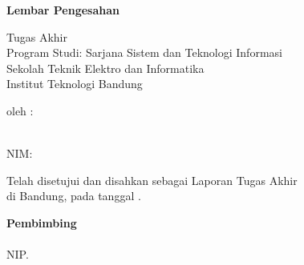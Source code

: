 \clearpage
\pagestyle{empty}

\begin{center}
\smallskip

    {\Large \bfseries Lembar Pengesahan}

    \MakeUppercase{\normalsize \bfseries \thetitle}
    \vfill

    \normalsize Tugas Akhir \\
    Program Studi: Sarjana Sistem dan Teknologi Informasi \\
    Sekolah Teknik Elektro dan Informatika \\
    Institut Teknologi Bandung \\
    \vfill

    \normalsize oleh :

    \normalsize \theauthor \\
    \normalsize NIM: \nim

    \vfill
    \normalsize \normalfont
    Telah disetujui dan disahkan sebagai Laporan Tugas Akhir \\
    di Bandung, pada tanggal \thedate{} \yearsidang{}.

    \vfill
    {\bfseries Pembimbing} \\
    \vfill
    \underline{\namapembimbing} \\
    NIP. \nippembimbing

\end{center}
\clearpage
